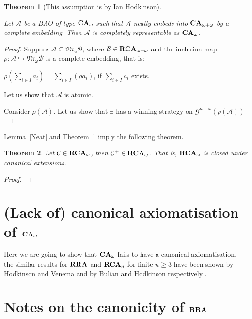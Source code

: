 \documentclass[a4paper]{article}
\theoremstyle{defin}
\theoremstyle{theorem}
\newtheorem{theorem}{Theorem}
\theoremstyle{prop}
\theoremstyle{lemma}
\theoremstyle{fact}
\theoremstyle{ex}
\theoremstyle{col}
\begin{document}
\begin{theorem}[This assumption is by Ian Hodkinson]\label{Neat2}
  $ $

  Let $\mathcal{A}$ be a BAO of type ${\bf CA}_{\omega}$ such that $\mathcal{A}$ neatly embeds into ${\bf CA}_{\omega + \omega}$ by a complete embedding. Then $\mathcal{A}$ is completely representable as ${\bf CA}_{\omega}$.
\end{theorem}

\begin{proof}
  Suppose $\mathcal{A} \subseteq \mathfrak{Nr}_{\omega} \mathcal{B}$, where $\mathcal{B} \in {\bf RCA}_{\omega + \omega}$ and the inclusion map $\rho : \mathcal{A} \hookrightarrow \mathfrak{Nr}_{\omega} \mathcal{B}$ is a complete embedding, that is:
  \begin{center}
    $\rho (\sum \limits_{i \in I} a_i) = \sum \limits_{i \in I} (\rho a_i)$, if $\sum \limits_{i \in I} a_i$ exists.
  \end{center}

  Let us show that $\mathcal{A}$ is atomic.

  Consider $\rho(\mathcal{A})$. Let us show that $\exists$ has a winning strategy on $\mathcal{G}^{\kappa + \omega}(\rho(\mathcal{A}))$
\end{proof}

Lemma~\ref{Neat} and Theorem~\ref{Neat2} imply the following theorem.

\begin{theorem}
  Let $\mathcal{C} \in {\bf RCA}_{\omega}$, then $\mathcal{C}^{+} \in {\bf RCA}_{\omega}$. That is, ${\bf RCA}_{\omega}$ is closed under canonical extensions.
\end{theorem}

\begin{proof}

\end{proof}

\section{(Lack of) canonical axiomatisation of ${\bf CA}_{\omega}$}

Here we are going to show that ${\bf CA}_{\omega}$ fails to have a canonical axiomatisation, the similar results for ${\bf RRA}$ and ${\bf RCA}_n$ for finite $n \geq 3$ have been shown by Hodkinson and Venema \cite{hodkinson2005canonical} and by Bulian and Hodkinson respectively \cite{bulian2013bare}.

\section{Notes on the canonicity of ${\bf RRA}$}
\end{document}
